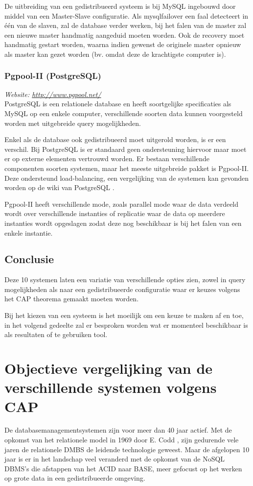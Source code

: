 De uitbreiding van een gedistribueerd systeem is bij MySQL ingebouwd door middel van een Master-Slave configuratie. Als mysqlfailover een faal detecteert in één van de slaven, zal de database verder werken, bij het falen van de master zal een nieuwe master handmatig aangeduid moeten worden. Ook de recovery moet handmatig gestart worden, waarna indien gewenst de originele master opnieuw als master kan gezet worden (bv. omdat deze de krachtigste computer is). 

\subsubsection{Pgpool-II (PostgreSQL)}
\textit{Website: \url{http://www.pgpool.net/}}\\
PostgreSQL is een relationele database en heeft soortgelijke specificaties als MySQL op een enkele computer, verschillende soorten data kunnen voorgesteld worden met uitgebreide query mogelijkheden. 

Enkel als de database ook gedistribueerd moet uitgerold worden, is er een verschil. Bij PostgreSQL is er standaard geen ondersteuning hiervoor maar moet er op externe elementen vertrouwd worden. Er bestaan verschillende componenten soorten systemen, maar het meeste uitgebreide pakket is Pgpool-II. Deze ondersteund load-balancing, een vergelijking van de systemen kan gevonden worden op de wiki van PostgreSQL \cite{postgresql-clustering}. 

Pgpool-II heeft verschillende mode, zoals parallel mode waar de data verdeeld wordt over verschillende instanties of replicatie waar de data op meerdere instanties wordt opgeslagen zodat deze nog beschikbaar is bij het falen van een enkele instantie.

\subsection{Conclusie} 
Deze 10 systemen laten een variatie van verschillende opties zien, zowel in query mogelijkheden als naar een gedistribueerde configuratie waar er keuzes volgens het CAP theorema gemaakt moeten worden. 

Bij het kiezen van een systeem is het moeilijk om een keuze te maken af en toe, in het volgend gedeelte zal er besproken worden wat er momenteel beschikbaar is als resultaten of te gebruiken tool. 

\section{Objectieve vergelijking van de verschillende systemen volgens CAP}
De databasemanagementsystemen zijn voor meer dan 40 jaar actief. Met de opkomst van het relationele model in 1969 door E. Codd \cite{Codd:1970:RMD:362384.362685}, zijn gedurende vele jaren de relationele DMBS de leidende technologie geweest. Maar de afgelopen 10 jaar is er in het landschap veel veranderd met de opkomst van de NoSQL DBMS's die afstappen van het ACID naar BASE, meer gefocust op het werken op grote data in een gedistribueerde omgeving. 

